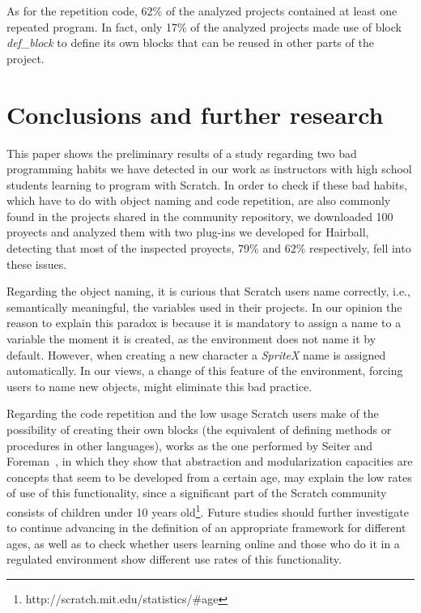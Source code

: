 \documentclass[conference]{format/IEEEtran}
\begin{document}
As for the repetition code, 62\% of the analyzed projects contained at least one repeated program. In fact, only 17\% of the analyzed projects made use of block \textit{def\_block} to define its own blocks that can be reused in other parts of the project. 

\section{Conclusions and further research}
\label{sec:conclusions}


This paper shows the preliminary results of a study regarding two bad programming habits we have detected in our work as instructors with high school students learning to program with Scratch. In order to check if these bad habits, which have to do with object naming and code repetition, are also commonly found in the projects shared in the community repository, we downloaded 100 proyects and analyzed them with two plug-ins we developed for Hairball, detecting that most of the inspected proyects, 79\% and 62\%  respectively, fell into these issues.

Regarding the object naming, it is curious that Scratch users name correctly, i.e., semantically meaningful, the variables used in their projects. In our opinion the reason to explain this paradox is because it is mandatory to assign a name to a variable the moment it is created, as the environment does not name it by default. However, when creating a new character a  \textit{SpriteX} name is assigned automatically. In our views, a change of this feature of the environment, forcing users to name new objects, might eliminate this bad practice.

Regarding the code repetition and the low usage Scratch users make of the possibility of creating their own blocks (the equivalent of defining methods or procedures in other languages), works as the one performed by Seiter and Foreman~\cite {seiter2013modeling}, in which they show that abstraction and modularization capacities are concepts that seem to be developed from a certain age, may explain the low rates of use of this functionality, since a significant part of the Scratch community consists of children under 10 years old\footnote{http://scratch.mit.edu/statistics/\#age}. Future studies should further investigate to continue advancing in the definition of an appropriate framework for different ages, as well as to check whether users learning online and those who do it in a regulated environment show different use rates of this functionality.
\end{document}
